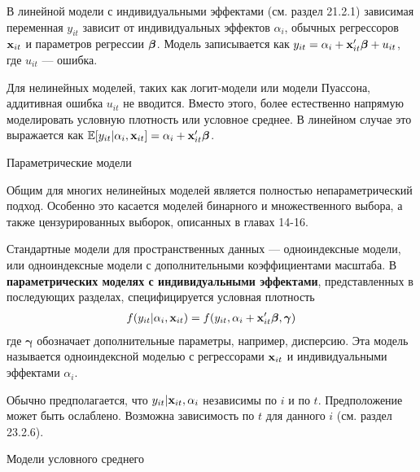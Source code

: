 В линейной модели с индивидуальными эффектами (см. раздел 21.2.1) зависимая переменная $y_{it}$ зависит от индивидуальных эффектов $\alpha_i$, обычных регрессоров $\mathbf{x}_{it}$ и параметров регрессии $\bm{\beta}$. Модель записывается как $y_{it}=\alpha_i+\mathbf{x}'_{it}\bm{\beta} + u_{it}$, где $u_{it}$ --- ошибка.

Для нелинейных моделей, таких как логит-модели или модели Пуассона, аддитивная ошибка $u_{it}$ не вводится. Вместо этого, более естественно напрямую моделировать условную плотность или условное среднее. В линейном случае это выражается как $\mathbb{E}[y_{it}|\alpha_i, \mathbf{x}_{it}]=\alpha_i+\mathbf{x}'_{it}\bm{\beta}$.

{\centering Параметрические модели \\
}

Общим для многих нелинейных моделей является полностью непараметрический подход. Особенно это касается моделей бинарного и множественного выбора, а также цензурированных выборок, описанных в главах 14-16.

Стандартные модели для пространственных данных  --- одноиндексные модели, или одноиндексные модели с дополнительными коэффициентами масштаба. В \textbf{параметрических моделях с индивидуальными эффектами}, представленных в последующих разделах, специфицируется условная плотность
\begin{align}
f(y_{it}|\alpha_i, \mathbf{x}_{it})=f(y_{it}, \alpha_i+\mathbf{x}'_{it}\bm{\beta}, \bm\gamma)
\label{Eq:23.1}
\end{align}
где $\bm\gamma$  обозначает дополнительные параметры, например, дисперсию. Эта модель называется одноиндексной моделью с регрессорами $\mathbf{x}_{it}$  и индивидуальными эффектами $\alpha_i$.

Обычно предполагается, что $y_{it}|\mathbf{x}_{it}, \alpha_i$ независимы по $i$ и по $t$.  Предположение может быть ослаблено. Возможна зависимость по $t$ для данного $i$ (см. раздел 23.2.6).

 {\centering Модели условного среднего \\}

